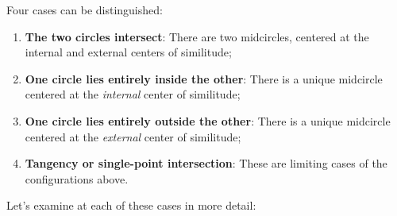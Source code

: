Four cases can be distinguished:

\begin{enumerate}[label=(\roman*)]
  \item \textbf{The two circles intersect}: There are two midcircles, centered at the internal and external centers of similitude;
  \item \textbf{One circle lies entirely inside the other}: There is a unique midcircle centered at the \emph{internal} center of similitude;
  \item \textbf{One circle lies entirely outside the other}: There is a unique midcircle centered at the \emph{external} center of similitude;
  \item \textbf{Tangency or single-point intersection}: These are limiting cases of the configurations above.
\end{enumerate}


\vspace{1em}
Let’s examine at each of these cases in more detail:


